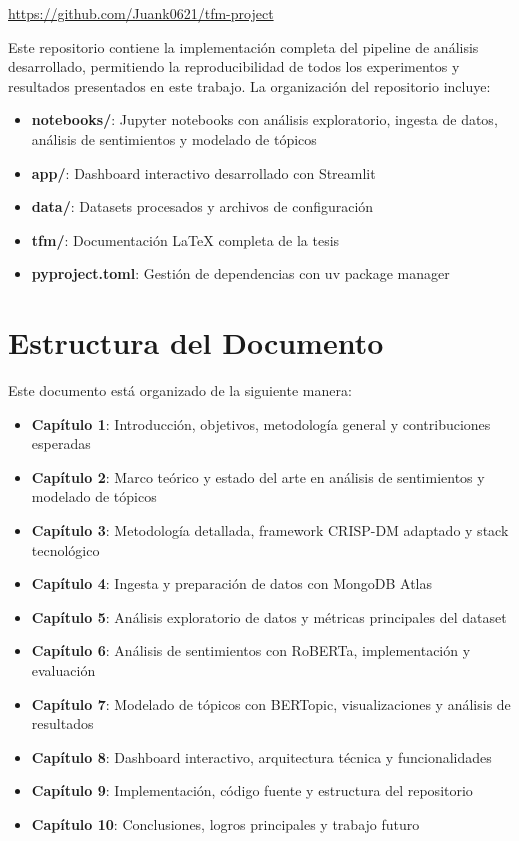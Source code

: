 \documentclass[12pt,a4paper,twoside,openany]{book}
\begin{document}
\begin{center}
\url{https://github.com/Juank0621/tfm-project}
\end{center}

Este repositorio contiene la implementación completa del pipeline de análisis desarrollado, permitiendo la reproducibilidad de todos los experimentos y resultados presentados en este trabajo. La organización del repositorio incluye:

\begin{itemize}
    \item \textbf{notebooks/}: Jupyter notebooks con análisis exploratorio, ingesta de datos, análisis de sentimientos y modelado de tópicos
    \item \textbf{app/}: Dashboard interactivo desarrollado con Streamlit
    \item \textbf{data/}: Datasets procesados y archivos de configuración
    \item \textbf{tfm/}: Documentación LaTeX completa de la tesis
    \item \textbf{pyproject.toml}: Gestión de dependencias con uv package manager
\end{itemize}

\section{Estructura del Documento}

Este documento está organizado de la siguiente manera:

\begin{itemize}
    \item \textbf{Capítulo 1}: Introducción, objetivos, metodología general y contribuciones esperadas
    \item \textbf{Capítulo 2}: Marco teórico y estado del arte en análisis de sentimientos y modelado de tópicos
    \item \textbf{Capítulo 3}: Metodología detallada, framework CRISP-DM adaptado y stack tecnológico
    \item \textbf{Capítulo 4}: Ingesta y preparación de datos con MongoDB Atlas
    \item \textbf{Capítulo 5}: Análisis exploratorio de datos y métricas principales del dataset
    \item \textbf{Capítulo 6}: Análisis de sentimientos con RoBERTa, implementación y evaluación
    \item \textbf{Capítulo 7}: Modelado de tópicos con BERTopic, visualizaciones y análisis de resultados
    \item \textbf{Capítulo 8}: Dashboard interactivo, arquitectura técnica y funcionalidades
    \item \textbf{Capítulo 9}: Implementación, código fuente y estructura del repositorio
    \item \textbf{Capítulo 10}: Conclusiones, logros principales y trabajo futuro
\end{itemize}
\end{document}

